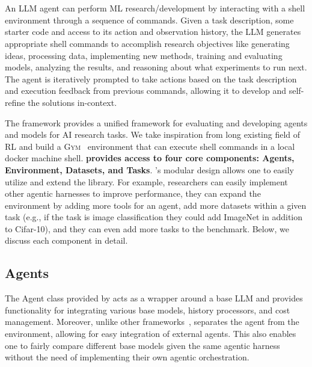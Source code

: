 \section{\mlgym}

An LLM agent can perform ML research/development by interacting with a shell environment through a sequence of commands.
%
Given a task description, some starter code and access to its action and observation history, the LLM generates appropriate shell commands to accomplish research objectives like generating ideas, processing data, implementing new methods, training and evaluating models, analyzing the results, and reasoning about what experiments to run next.
%
The agent is iteratively prompted to take actions based on the task description and execution feedback from previous commands, allowing it to develop and self-refine the solutions in-context.
%

The \mlgym framework provides a unified framework for evaluating and developing agents and models for AI research tasks. We take inspiration from long existing field of RL and build a \textsc{Gym}~\citep{brockman2016openai} environment that can execute shell commands in a local docker machine shell. 
\mlgym \textbf{provides access to four core components: Agents, Environment, Datasets, and Tasks}. \mlgym's modular design allows one to easily utilize and extend the library.
For example, researchers can easily implement other agentic harnesses to improve performance, they can expand the environment by adding more tools for an agent, add more datasets within a given task (e.g., if the task is image classification they could add ImageNet in addition to Cifar-10), and they can even add more tasks to the \mlgym benchmark. Below, we discuss each component in detail.

\subsection{Agents}
\label{sec:agents}
The Agent class provided by \mlgym acts as a wrapper around a base LLM and provides functionality for integrating various base models, history processors, and cost management.
%
Moreover, unlike other frameworks~\citep{huangMLAgentBenchEvaluatingLanguage2024,yangSWEagentAgentComputerInterfaces2024}, \mlgym separates the agent from the environment, allowing for easy integration of external agents.
This also enables one to fairly compare different base models given the same agentic harness without the need of implementing their own agentic orchestration.

